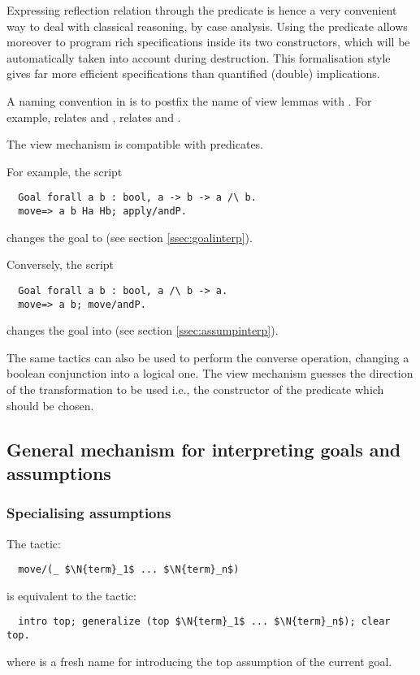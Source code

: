 Expressing reflection relation through the  predicate
is hence a very convenient way to deal with classical reasoning, by
case analysis. Using the  predicate allows moreover to
program rich specifications inside
its two constructors, which will be automatically taken into account
during destruction. This formalisation style gives far more
efficient specifications than quantified (double) implications.


A naming convention in \ssr{} is to postfix the name of view lemmas with .
For example,  relates  \C{||} and \C{\\/},  relates
\C{\~\~} and \C{\~}.

The view mechanism is compatible with  predicates.

For example, the script
\begin{lstlisting}
  Goal forall a b : bool, a -> b -> a /\ b.
  move=> a b Ha Hb; apply/andP.
\end{lstlisting}
changes the goal  to  (see section \ref{ssec:goalinterp}).

Conversely, the script
\begin{lstlisting}
  Goal forall a b : bool, a /\ b -> a.
  move=> a b; move/andP.
\end{lstlisting}
changes the goal  into  (see section
\ref{ssec:assumpinterp}).


The same tactics can also be used to perform the converse
operation, changing a boolean conjunction into a logical one. The view
mechanism guesses the direction of the
transformation to be used i.e., the constructor of the 
predicate which should be chosen.

\subsection{General mechanism for interpreting goals and assumptions}


\subsubsection*{Specialising assumptions}

The \ssr{}
tactic:
\begin{lstlisting}
  move/(_ $\N{term}_1$ ... $\N{term}_n$)
\end{lstlisting}
is equivalent to the tactic:
\begin{lstlisting}
  intro top; generalize (top $\N{term}_1$ ... $\N{term}_n$); clear top.
\end{lstlisting}
where  is a fresh name for introducing the top assumption of
the current goal.


